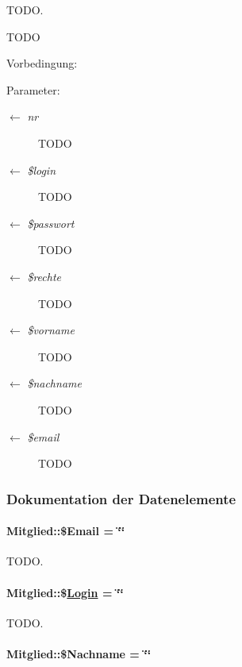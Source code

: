 TODO. 

TODO \begin{Desc}
\item[Vorbedingung:]\end{Desc}
\begin{Desc}
\item[Parameter:]
\begin{description}
\item[\mbox{$\leftarrow$} {\em nr}]TODO \item[\mbox{$\leftarrow$} {\em \$login}]TODO \item[\mbox{$\leftarrow$} {\em \$passwort}]TODO \item[\mbox{$\leftarrow$} {\em \$rechte}]TODO \item[\mbox{$\leftarrow$} {\em \$vorname}]TODO \item[\mbox{$\leftarrow$} {\em \$nachname}]TODO \item[\mbox{$\leftarrow$} {\em \$email}]TODO \end{description}
\end{Desc}


\subsubsection{Dokumentation der Datenelemente}
\hypertarget{classMitglied_4be6b837c482ac912188663380d31122}{
\paragraph[\$Email]{\setlength{\rightskip}{0pt plus 5cm}Mitglied::\$Email = \char`\"{}\char`\"{}}\hfill}
\label{classMitglied_4be6b837c482ac912188663380d31122}


TODO. 

\hypertarget{classMitglied_626ee2f2551cc2840bdeac6a04491b2e}{
\paragraph[\$Login]{\setlength{\rightskip}{0pt plus 5cm}Mitglied::\$\hyperlink{classLogin}{Login} = \char`\"{}\char`\"{}}\hfill}
\label{classMitglied_626ee2f2551cc2840bdeac6a04491b2e}


TODO. 

\hypertarget{classMitglied_635def9ec266748689397299c7f79d9c}{
\paragraph[\$Nachname]{\setlength{\rightskip}{0pt plus 5cm}Mitglied::\$Nachname = \char`\"{}\char`\"{}}\hfill}
\label{classMitglied_635def9ec266748689397299c7f79d9c}


